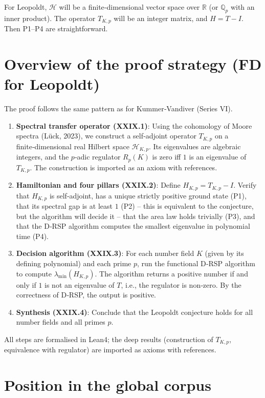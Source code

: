 \documentclass[11pt,a4paper]{article}
\begin{document}
For Leopoldt, $\mathcal{H}$ will be a finite‑dimensional vector space over $\mathbb{R}$ (or $\mathbb{Q}_p$ with an inner product). The operator $T_{K,p}$ will be an integer matrix, and $H = T - I$. Then P1–P4 are straightforward.

\section{Overview of the proof strategy (FD for Leopoldt)}

The proof follows the same pattern as for Kummer‑Vandiver (Series VI).

\begin{enumerate}
\item \textbf{Spectral transfer operator (XXIX.1)}: Using the cohomology of Moore spectra (Lück, 2023), we construct a self‑adjoint operator $T_{K,p}$ on a finite‑dimensional real Hilbert space $\mathcal{H}_{K,p}$. Its eigenvalues are algebraic integers, and the $p$‑adic regulator $R_p(K)$ is zero iff $1$ is an eigenvalue of $T_{K,p}$. The construction is imported as an axiom with references.
\item \textbf{Hamiltonian and four pillars (XXIX.2)}: Define $H_{K,p} = T_{K,p} - I$. Verify that $H_{K,p}$ is self‑adjoint, has a unique strictly positive ground state (P1), that its spectral gap is at least $1$ (P2) – this is equivalent to the conjecture, but the algorithm will decide it – that the area law holds trivially (P3), and that the D‑RSP algorithm computes the smallest eigenvalue in polynomial time (P4).
\item \textbf{Decision algorithm (XXIX.3)}: For each number field $K$ (given by its defining polynomial) and each prime $p$, run the functional D‑RSP algorithm to compute $\lambda_{\min}(H_{K,p})$. The algorithm returns a positive number if and only if $1$ is not an eigenvalue of $T$, i.e., the regulator is non‑zero. By the correctness of D‑RSP, the output is positive.
\item \textbf{Synthesis (XXIX.4)}: Conclude that the Leopoldt conjecture holds for all number fields and all primes $p$.
\end{enumerate}

All steps are formalised in Lean4; the deep results (construction of $T_{K,p}$, equivalence with regulator) are imported as axioms with references.

\section{Position in the global corpus}
\end{document}

